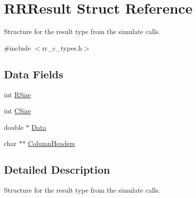 \hypertarget{struct_r_r_result}{
\section{\-R\-R\-Result \-Struct \-Reference}
\label{struct_r_r_result}
}


\-Structure for the result type from the simulate calls.  




{\ttfamily \#include $<$rr\-\_\-c\-\_\-types.\-h$>$}

\subsection*{\-Data \-Fields}
\begin{DoxyCompactItemize}
\item 
int \hyperlink{struct_r_r_result_a4d8512c879223c0e0d1522dae38e7819}{\-R\-Size}
\item 
int \hyperlink{struct_r_r_result_a17c9a5894aa9cb3789346dcaa9c370bb}{\-C\-Size}
\item 
double $\ast$ \hyperlink{struct_r_r_result_a7c5cbda3aa940f4b0d6e8a1679307dfc}{\-Data}
\item 
char $\ast$$\ast$ \hyperlink{struct_r_r_result_ab339159e5604808f92fe793f4f43da03}{\-Column\-Headers}
\end{DoxyCompactItemize}


\subsection{\-Detailed \-Description}
\-Structure for the result type from the simulate calls. 

